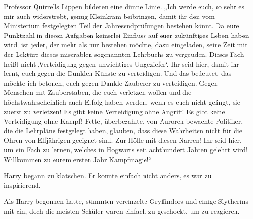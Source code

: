 Professor Quirrells Lippen bildeten eine dünne Linie. „Ich werde euch, so sehr es mir auch widerstrebt, genug Kleinkram beibringen, damit ihr den vom Ministerium festgelegten Teil der Jahresendprüfungen bestehen könnt. Da eure Punktzahl in diesen Aufgaben keinerlei Einfluss auf euer zukünftiges Leben haben wird, ist jeder, der mehr als nur bestehen möchte, dazu eingeladen, seine Zeit mit der Lektüre dieses miserablen sogenannten Lehrbuchs zu vergeuden. Dieses Fach heißt nicht ‚Verteidigung gegen unwichtiges Ungeziefer‘. Ihr seid hier, damit ihr lernt, euch gegen die Dunklen Künste zu verteidigen. Und das bedeutet, das möchte ich betonen, euch gegen Dunkle Zauberer zu verteidigen. Gegen Menschen mit Zauberstäben, die euch verletzen wollen und die höchstwahrscheinlich auch Erfolg haben werden, wenn es euch nicht gelingt, sie zuerst zu verletzen! Es gibt keine Verteidigung ohne Angriff! Es gibt keine Verteidigung ohne Kampf! Fette, überbezahlte, von Auroren bewachte Politiker, die die Lehrpläne festgelegt haben, glauben, dass diese Wahrheiten nicht für die Ohren von Elfjährigen geeignet sind. Zur Hölle mit diesen Narren! Ihr seid hier, um ein Fach zu lernen, welches in Hogwarts seit achthundert Jahren gelehrt wird! Willkommen zu eurem ersten Jahr Kampfmagie!“

Harry begann zu klatschen. Er konnte einfach nicht anders, es war zu inspirierend.

Als Harry begonnen hatte, stimmten vereinzelte Gryffindors und einige Slytherins mit ein, doch die meisten Schüler waren einfach zu geschockt, um zu reagieren.

